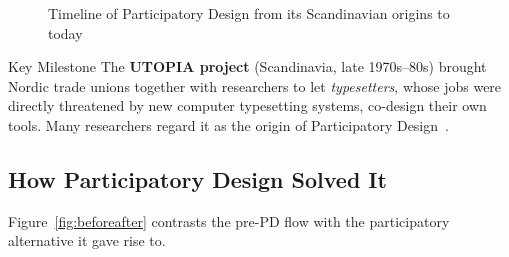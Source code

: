 \documentclass[a4paper,12pt]{article}
\begin{document}
\begin{figure}[H]
\centering
{}
\caption{Timeline of Participatory Design from its Scandinavian origins to today}
\label{fig:timeline}
\end{figure}

\begin{keybox}{Key Milestone}
The \textbf{UTOPIA project} (Scandinavia, late 1970s--80s) brought Nordic trade unions together with researchers to let \emph{typesetters}, whose jobs were directly threatened by new computer typesetting systems, co-design their own tools. Many researchers regard it as the origin of Participatory Design~\cite{ehn1988}.
\end{keybox}

\subsection{How Participatory Design Solved It}
Figure~\ref{fig:beforeafter} contrasts the pre-PD flow with the participatory alternative it gave rise to.
\end{document}

